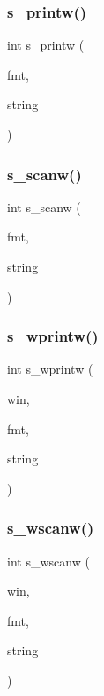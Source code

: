 \mbox{\label{C-macros_8c_a952575ee46d2e04849c57062c2cb769e}} 
\subsubsection{\texorpdfstring{s\+\_\+printw()}{s\_printw()}}
{\footnotesize\ttfamily int s\+\_\+printw (\begin{DoxyParamCaption}\item[{const char $\ast$}]{fmt,  }\item[{char $\ast$}]{string }\end{DoxyParamCaption})}

\mbox{\label{C-macros_8c_a1e1dafd3d6cad8ea2d5f8609c242066e}} 
\subsubsection{\texorpdfstring{s\+\_\+scanw()}{s\_scanw()}}
{\footnotesize\ttfamily int s\+\_\+scanw (\begin{DoxyParamCaption}\item[{char $\ast$}]{fmt,  }\item[{char $\ast$}]{string }\end{DoxyParamCaption})}

\mbox{\label{C-macros_8c_a90e6df6fa68a7a58b21a763fc85a21ff}} 
\subsubsection{\texorpdfstring{s\+\_\+wprintw()}{s\_wprintw()}}
{\footnotesize\ttfamily int s\+\_\+wprintw (\begin{DoxyParamCaption}\item[{W\+I\+N\+D\+OW $\ast$}]{win,  }\item[{const char $\ast$}]{fmt,  }\item[{char $\ast$}]{string }\end{DoxyParamCaption})}

\mbox{\label{C-macros_8c_a261b2a08296fc9699afe31cc2c578410}} 
\subsubsection{\texorpdfstring{s\+\_\+wscanw()}{s\_wscanw()}}
{\footnotesize\ttfamily int s\+\_\+wscanw (\begin{DoxyParamCaption}\item[{W\+I\+N\+D\+OW $\ast$}]{win,  }\item[{char $\ast$}]{fmt,  }\item[{char $\ast$}]{string }\end{DoxyParamCaption})}

